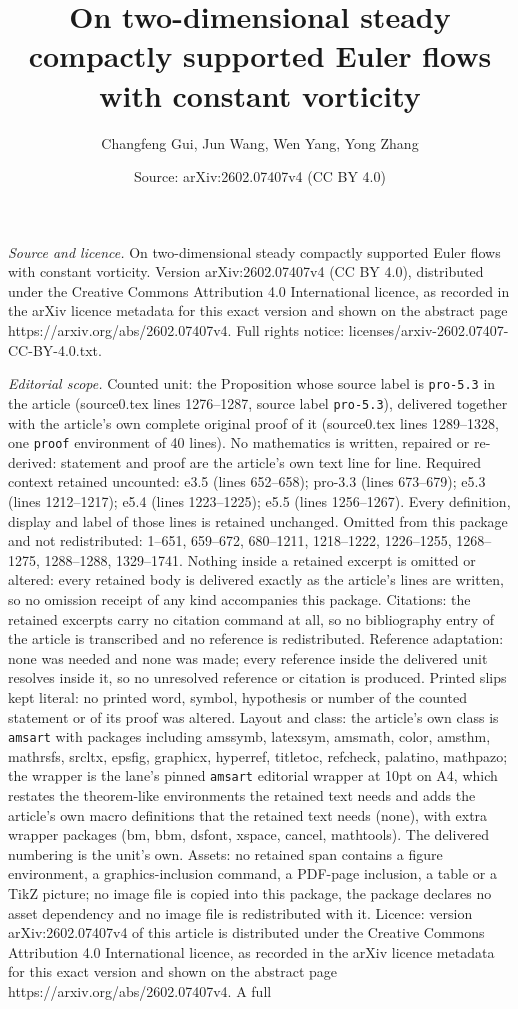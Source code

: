 \documentclass[10pt,a4paper]{amsart}
\title[On two-dimensional steady compactly supported Euler flows wi]{On two-dimensional steady compactly supported Euler flows with constant vorticity}
\author{Changfeng Gui, Jun Wang, Wen Yang, Yong Zhang}
\date{Source: arXiv:2602.07407v4 (CC BY 4.0)}
\begin{document}
\maketitle

\noindent\emph{Source and licence.} On two-dimensional steady compactly supported Euler flows with constant vorticity. Version arXiv:2602.07407v4 (CC BY 4.0), distributed under the Creative Commons Attribution 4.0 International licence, as recorded in the arXiv licence metadata for this exact version and shown on the abstract page https://arxiv.org/abs/2602.07407v4. Full rights notice: licenses/arxiv-2602.07407-CC-BY-4.0.txt.\par\smallskip

\noindent\textit{Editorial scope.} Counted unit: the Proposition whose source label is \texttt{pro-5.3} in the article (source0.tex lines 1276--1287, source label \texttt{pro-5.3}), delivered together with the article's own complete original proof of it (source0.tex lines 1289--1328, one \texttt{proof} environment of 40 lines). No mathematics is written, repaired or re-derived: statement and proof are the article's own text line for line. Required context retained uncounted: e3.5 (lines 652--658); pro-3.3 (lines 673--679); e5.3 (lines 1212--1217); e5.4 (lines 1223--1225); e5.5 (lines 1256--1267). Every definition, display and label of those lines is retained unchanged. Omitted from this package and not redistributed: 1--651, 659--672, 680--1211, 1218--1222, 1226--1255, 1268--1275, 1288--1288, 1329--1741. Nothing inside a retained excerpt is omitted or altered: every retained body is delivered exactly as the article's lines are written, so no omission receipt of any kind accompanies this package. Citations: the retained excerpts carry no citation command at all, so no bibliography entry of the article is transcribed and no reference is redistributed. Reference adaptation: none was needed and none was made; every reference inside the delivered unit resolves inside it, so no unresolved reference or citation is produced. Printed slips kept literal: no printed word, symbol, hypothesis or number of the counted statement or of its proof was altered. Layout and class: the article's own class is \texttt{amsart} with packages including amssymb, latexsym, amsmath, color, amsthm, mathrsfs, srcltx, epsfig, graphicx, hyperref, titletoc, refcheck, palatino, mathpazo; the wrapper is the lane's pinned \texttt{amsart} editorial wrapper at 10pt on A4, which restates the theorem-like environments the retained text needs and adds the article's own macro definitions that the retained text needs (none), with extra wrapper packages (bm, bbm, dsfont, xspace, cancel, mathtools). The delivered numbering is the unit's own. Assets: no retained span contains a figure environment, a graphics-inclusion command, a PDF-page inclusion, a table or a TikZ picture; no image file is copied into this package, the package declares no asset dependency and no image file is redistributed with it. Licence: version arXiv:2602.07407v4 of this article is distributed under the Creative Commons Attribution 4.0 International licence, as recorded in the arXiv licence metadata for this exact version and shown on the abstract page https://arxiv.org/abs/2602.07407v4. A full 
\end{document}
